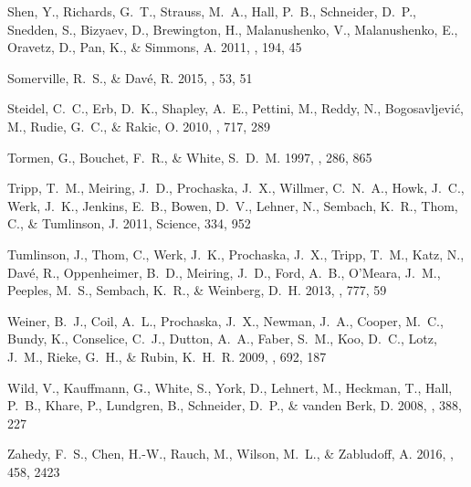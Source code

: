 \documentclass[iop]{emulateapj}
\begin{document}
\begin{thebibliography}{45}
{Shen}, Y., {Richards}, G.~T., {Strauss}, M.~A., {Hall}, P.~B., {Schneider},
  D.~P., {Snedden}, S., {Bizyaev}, D., {Brewington}, H., {Malanushenko}, V.,
  {Malanushenko}, E., {Oravetz}, D., {Pan}, K., \& {Simmons}, A. 2011, \apjs,
  194, 45

{Somerville}, R.~S., \& {Dav{\'e}}, R. 2015, \araa, 53, 51

{Steidel}, C.~C., {Erb}, D.~K., {Shapley}, A.~E., {Pettini}, M., {Reddy}, N.,
  {Bogosavljevi{\'c}}, M., {Rudie}, G.~C., \& {Rakic}, O. 2010, \apj, 717, 289

{Tormen}, G., {Bouchet}, F.~R., \& {White}, S.~D.~M. 1997, \mnras, 286, 865

{Tripp}, T.~M., {Meiring}, J.~D., {Prochaska}, J.~X., {Willmer}, C.~N.~A.,
  {Howk}, J.~C., {Werk}, J.~K., {Jenkins}, E.~B., {Bowen}, D.~V., {Lehner}, N.,
  {Sembach}, K.~R., {Thom}, C., \& {Tumlinson}, J. 2011, Science, 334, 952

{Tumlinson}, J., {Thom}, C., {Werk}, J.~K., {Prochaska}, J.~X., {Tripp}, T.~M.,
  {Katz}, N., {Dav{\'e}}, R., {Oppenheimer}, B.~D., {Meiring}, J.~D., {Ford},
  A.~B., {O'Meara}, J.~M., {Peeples}, M.~S., {Sembach}, K.~R., \& {Weinberg},
  D.~H. 2013, \apj, 777, 59

{Weiner}, B.~J., {Coil}, A.~L., {Prochaska}, J.~X., {Newman}, J.~A., {Cooper},
  M.~C., {Bundy}, K., {Conselice}, C.~J., {Dutton}, A.~A., {Faber}, S.~M.,
  {Koo}, D.~C., {Lotz}, J.~M., {Rieke}, G.~H., \& {Rubin}, K.~H.~R. 2009, \apj,
  692, 187

{Wild}, V., {Kauffmann}, G., {White}, S., {York}, D., {Lehnert}, M., {Heckman},
  T., {Hall}, P.~B., {Khare}, P., {Lundgren}, B., {Schneider}, D.~P., \&
  {vanden Berk}, D. 2008, \mnras, 388, 227

{Zahedy}, F.~S., {Chen}, H.-W., {Rauch}, M., {Wilson}, M.~L., \& {Zabludoff},
  A. 2016, \mnras, 458, 2423

\end{thebibliography}
\end{document}
